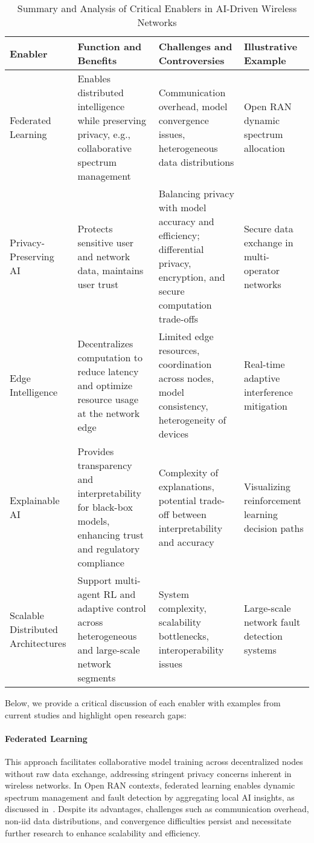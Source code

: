 \documentclass[sigconf]{acmart}
\begin{document}
\begin{table*}[htbp]
\centering
\caption{Summary and Analysis of Critical Enablers in AI-Driven Wireless Networks}
\label{tab:critical_enablers}
\begin{adjustbox}{max width=\textwidth}
\begin{tabular}{@{}llll@{}}
\toprule
\textbf{Enabler} & \textbf{Function and Benefits} & \textbf{Challenges and Controversies} & \textbf{Illustrative Example} \\ \midrule
Federated Learning & Enables distributed intelligence while preserving privacy, e.g., collaborative spectrum management & Communication overhead, model convergence issues, heterogeneous data distributions & Open RAN dynamic spectrum allocation \cite{ref49} \\
Privacy-Preserving AI & Protects sensitive user and network data, maintains user trust & Balancing privacy with model accuracy and efficiency; differential privacy, encryption, and secure computation trade-offs & Secure data exchange in multi-operator networks \\
Edge Intelligence & Decentralizes computation to reduce latency and optimize resource usage at the network edge & Limited edge resources, coordination across nodes, model consistency, heterogeneity of devices & Real-time adaptive interference mitigation \\
Explainable AI & Provides transparency and interpretability for black-box models, enhancing trust and regulatory compliance & Complexity of explanations, potential trade-off between interpretability and accuracy \cite{ref50} & Visualizing reinforcement learning decision paths \\
Scalable Distributed Architectures & Support multi-agent RL and adaptive control across heterogeneous and large-scale network segments & System complexity, scalability bottlenecks, interoperability issues & Large-scale network fault detection systems \\ \bottomrule
\end{tabular}
\end{adjustbox}
\end{table*}

Below, we provide a critical discussion of each enabler with examples from current studies and highlight open research gaps:

\paragraph{Federated Learning} This approach facilitates collaborative model training across decentralized nodes without raw data exchange, addressing stringent privacy concerns inherent in wireless networks. In Open RAN contexts, federated learning enables dynamic spectrum management and fault detection by aggregating local AI insights, as discussed in~\cite{ref49}. Despite its advantages, challenges such as communication overhead, non-iid data distributions, and convergence difficulties persist and necessitate further research to enhance scalability and efficiency.
\end{document}
